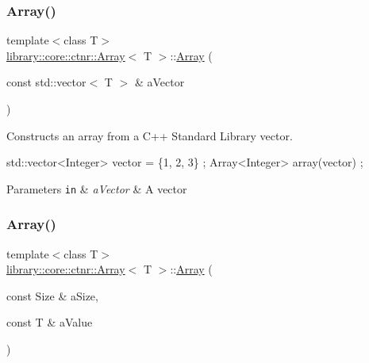 \subsubsection{\texorpdfstring{Array()}{Array()}\hspace{0.1cm}{\footnotesize\ttfamily [1/3]}}
{\footnotesize\ttfamily template$<$class T$>$ \\
\hyperlink{classlibrary_1_1core_1_1ctnr_1_1_array}{library\+::core\+::ctnr\+::\+Array}$<$ T $>$\+::\hyperlink{classlibrary_1_1core_1_1ctnr_1_1_array}{Array} (\begin{DoxyParamCaption}\item[{const std\+::vector$<$ T $>$ \&}]{a\+Vector }\end{DoxyParamCaption})}



Constructs an array from a C++ Standard Library vector. 


\begin{DoxyCode}
std::vector<Integer> vector = \{1, 2, 3\} ;
Array<Integer> array(vector) ;
\end{DoxyCode}



\begin{DoxyParams}[1]{Parameters}
\mbox{\tt in}  & {\em a\+Vector} & A vector \\
\hline
\end{DoxyParams}
\mbox{\label{classlibrary_1_1core_1_1ctnr_1_1_array_a647190cec3e259a8d8ad173c18bf3020}} 
\subsubsection{\texorpdfstring{Array()}{Array()}\hspace{0.1cm}{\footnotesize\ttfamily [2/3]}}
{\footnotesize\ttfamily template$<$class T$>$ \\
\hyperlink{classlibrary_1_1core_1_1ctnr_1_1_array}{library\+::core\+::ctnr\+::\+Array}$<$ T $>$\+::\hyperlink{classlibrary_1_1core_1_1ctnr_1_1_array}{Array} (\begin{DoxyParamCaption}\item[{const Size \&}]{a\+Size,  }\item[{const T \&}]{a\+Value }\end{DoxyParamCaption})}



